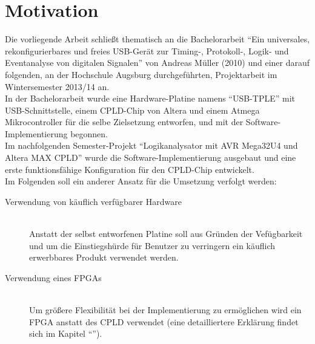 \clearpage



\section{Motivation}
\label{ch:Einfuehrung:Motivation}

Die vorliegende Arbeit schließt thematisch an die Bachelorarbeit ``Ein universales, rekonfigurierbares und freies USB-Gerät zur Timing-, Protokoll-, Logik- und Eventanalyse von digitalen Signalen'' von Andreas Müller (2010) und einer darauf folgenden, an der Hochschule Augsburg durchgeführten, Projektarbeit im Wintersemester 2013/14 an.\\
In der Bachelorarbeit wurde eine Hardware-Platine namens ``USB-TPLE'' mit USB-Schnittstelle, einem \acrshort{CPLD}-Chip von Altera und einem Atmega Mikrocontroller für die selbe Zielsetzung entworfen, und mit der Software-Implementierung begonnen\cite{ba:mueller}.\\  
Im nachfolgenden Semester-Projekt ``Logikanalysator mit AVR Mega32U4 und Altera MAX CPLD'' wurde die Software-Implementierung ausgebaut und eine erste funktionsfähige Konfiguration für den CPLD-Chip entwickelt.\\

Im Folgenden soll ein anderer Ansatz für die Umsetzung verfolgt werden:
\begin{description}
\item[Verwendung von käuflich verfügbarer Hardware] \hfill \\
Anstatt der selbst entworfenen Platine soll aus Gründen der Vefügbarkeit und um die Einstiegshürde für Benutzer zu verringern ein käuflich erwerbbares Produkt verwendet werden.

\item[Verwendung eines FPGAs] \hfill \\
Um größere Flexibilität bei der Implementierung zu ermöglichen wird ein \gls{FPGA} anstatt des \gls{CPLD} verwendet (eine detailliertere Erklärung findet sich im Kapitel ``'').
\end{description}

